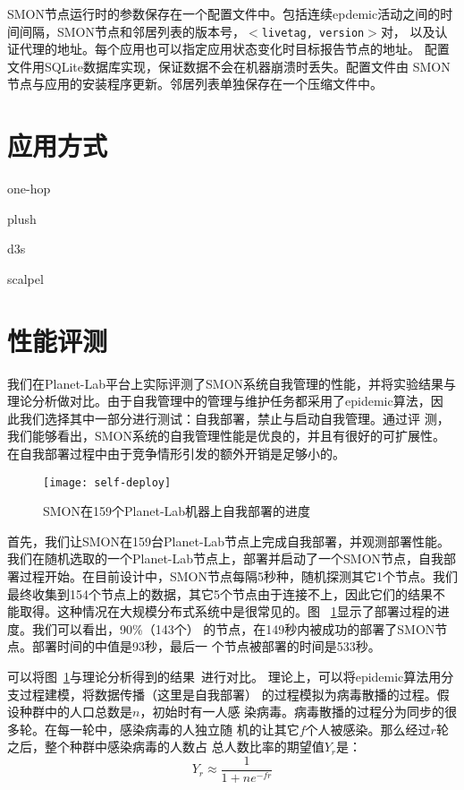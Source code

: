 SMON节点运行时的参数保存在一个配置文件中。包括连续epdemic活动之间的时
间间隔，SMON节点和邻居列表的版本号，$<$\texttt{livetag, version}$>$对，
以及认证代理的地址。每个应用也可以指定应用状态变化时目标报告节点的地址。
配置文件用SQLite数据库实现，保证数据不会在机器崩溃时丢失。配置文件由
SMON节点与应用的安装程序更新。邻居列表单独保存在一个压缩文件中。


\section{应用方式}
\label{sec:smon_app}
one-hop

plush

d3s

scalpel

\section{性能评测}
\label{sec:smon_eval}

我们在Planet-Lab平台上实际评测了SMON系统自我管理的性能，并将实验结果与
理论分析做对比。由于自我管理中的管理与维护任务都采用了epidemic算法，因
此我们选择其中一部分进行测试：自我部署，禁止与启动自我管理。通过评
测，我们能够看出，SMON系统的自我管理性能是优良的，并且有很好的可扩展性。
在自我部署过程中由于竞争情形引发的额外开销是足够小的。

\begin{figure}
\centering
  \begin{minipage}{0.8\linewidth}
    \centering
    \texttt{[image: self-deploy]}
    \caption{SMON在159个Planet-Lab机器上自我部署的进度}
    \label{fig:self-deploy}
  \end{minipage}
\end{figure}

首先，我们让SMON在159台Planet-Lab节点上完成自我部署，并观测部署性能。
我们在随机选取的一个Planet-Lab节点上，部署并启动了一个SMON节点，自我部
署过程开始。在目前设计中，SMON节点每隔5秒种，随机探测其它1个节点。我们
最终收集到154个节点上的数据，其它5个节点由于连接不上，因此它们的结果不
能取得。这种情况在大规模分布式系统中是很常见的。图~
\ref{fig:self-deploy}显示了部署过程的进度。我们可以看出，90\%（143个）
的节点，在149秒内被成功的部署了SMON节点。部署时间的中值是93秒，最后一
个节点被部署的时间是533秒。


可以将图~\ref{fig:self-deploy}与理论分析得到的结果~\cite{thebook}进行对比。
理论上，可以将epidemic算法用分支过程建模，将数据传播（这里是自我部署）
的过程模拟为病毒散播的过程。假设种群中的人口总数是$n$，初始时有一人感
染病毒。病毒散播的过程分为同步的很多轮。在每一轮中，感染病毒的人独立随
机的让其它$f$个人被感染。那么经过$r$轮之后，整个种群中感染病毒的人数占
总人数比率的期望值$Y_r$是：
\begin{equation*}
Y_r \approx \frac{1}{1+ne^{-fr}}
\end{equation*}

